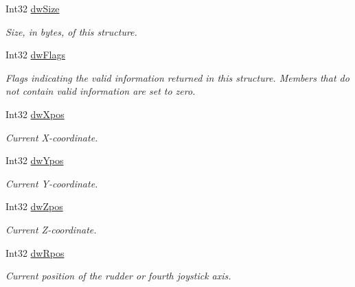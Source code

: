 \begin{DoxyCompactItemize}
\item 
Int32 \hyperlink{struct_tao_1_1_platform_1_1_windows_1_1_winmm_1_1_j_o_y_i_n_f_o_e_x_a074961de65f35479935c31054377637d}{dwSize}
\begin{DoxyCompactList}\small\item\em Size, in bytes, of this structure. \item\end{DoxyCompactList}\item 
Int32 \hyperlink{struct_tao_1_1_platform_1_1_windows_1_1_winmm_1_1_j_o_y_i_n_f_o_e_x_a1226a7ab8953fbb4ee49aeb6f4b770d3}{dwFlags}
\begin{DoxyCompactList}\small\item\em Flags indicating the valid information returned in this structure. Members that do not contain valid information are set to zero. \item\end{DoxyCompactList}\item 
Int32 \hyperlink{struct_tao_1_1_platform_1_1_windows_1_1_winmm_1_1_j_o_y_i_n_f_o_e_x_ad5988d07e0544cbe851a0e1dab91579f}{dwXpos}
\begin{DoxyCompactList}\small\item\em Current X-\/coordinate. \item\end{DoxyCompactList}\item 
Int32 \hyperlink{struct_tao_1_1_platform_1_1_windows_1_1_winmm_1_1_j_o_y_i_n_f_o_e_x_a566b2cdf669ef116d0376faa3f1c39fa}{dwYpos}
\begin{DoxyCompactList}\small\item\em Current Y-\/coordinate. \item\end{DoxyCompactList}\item 
Int32 \hyperlink{struct_tao_1_1_platform_1_1_windows_1_1_winmm_1_1_j_o_y_i_n_f_o_e_x_a78d8695dbaa84561cb76414a48604aea}{dwZpos}
\begin{DoxyCompactList}\small\item\em Current Z-\/coordinate. \item\end{DoxyCompactList}\item 
Int32 \hyperlink{struct_tao_1_1_platform_1_1_windows_1_1_winmm_1_1_j_o_y_i_n_f_o_e_x_a2a0b00a8a2d2e3f4b19da855910baa2a}{dwRpos}
\begin{DoxyCompactList}\small\item\em Current position of the rudder or fourth joystick axis. \item\end{DoxyCompactList}\item 

\end{DoxyCompactItemize}
